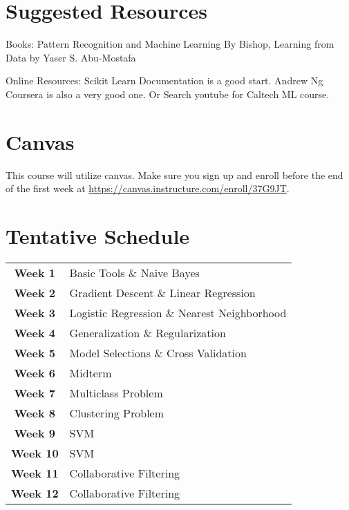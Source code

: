 \documentclass[a4paper, 12pt]{article}
\begin{document}
\section*{Suggested Resources}

Books: Pattern Recognition and Machine Learning By Bishop, Learning from Data by Yaser S. Abu-Mostafa

Online Resources:
Scikit Learn Documentation is a good start. Andrew Ng Coursera is also a very good one. Or Search youtube for Caltech ML course.

\section*{Canvas}

This course will utilize canvas. Make sure you sign up and enroll before the end of the first week at \url{https://canvas.instructure.com/enroll/37G9JT}.

\section*{Tentative Schedule}

\begin{center}
\setlength{\arrayrulewidth}{2pt} 
\begin{tabular}{cl}
	\arrayrulecolor{cobalt}\hline
    \textbf{Week 1 }& Basic Tools \& Naive Bayes \\
    \textbf{Week 2 }& Gradient Descent \& Linear Regression\\
    \textbf{Week 3 }& Logistic Regression \& Nearest Neighborhood \\
    \textbf{Week 4 }& Generalization \& Regularization \\
    \textbf{Week 5 }& Model Selections \& Cross Validation\\
    \textbf{Week 6 }& Midterm\\
    \textbf{Week 7 }& Multiclass Problem\\
    \textbf{Week 8}& Clustering Problem\\
    \textbf{Week 9 }& SVM\\
    \textbf{Week 10 }& SVM\\
    \textbf{Week 11}& Collaborative Filtering\\
    \textbf{Week 12}& Collaborative Filtering\\
	\hline
\end{tabular}
\end{center}
\end{document}
